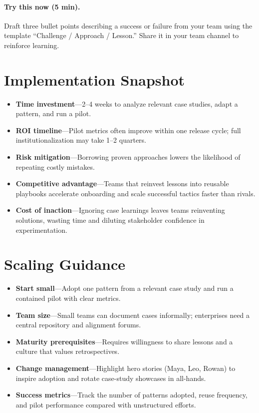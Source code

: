 \paragraph{Try this now (5 min).} Draft three bullet points describing a success or failure from your team using the template ``Challenge / Approach / Lesson.'' Share it in your team channel to reinforce learning.

\section{Implementation Snapshot}
\label{sec:case-snapshot}
\begin{itemize}
    \item \textbf{Time investment}—2--4 weeks to analyze relevant case studies, adapt a pattern, and run a pilot.
    \item \textbf{ROI timeline}—Pilot metrics often improve within one release cycle; full institutionalization may take 1--2 quarters.
    \item \textbf{Risk mitigation}—Borrowing proven approaches lowers the likelihood of repeating costly mistakes.
    \item \textbf{Competitive advantage}—Teams that reinvest lessons into reusable playbooks accelerate onboarding and scale successful tactics faster than rivals.
    \item \textbf{Cost of inaction}—Ignoring case learnings leaves teams reinventing solutions, wasting time and diluting stakeholder confidence in experimentation.
\end{itemize}

\section{Scaling Guidance}
\label{sec:case-scaling}
\begin{itemize}
    \item \textbf{Start small}—Adopt one pattern from a relevant case study and run a contained pilot with clear metrics.
    \item \textbf{Team size}—Small teams can document cases informally; enterprises need a central repository and alignment forums.
    \item \textbf{Maturity prerequisites}—Requires willingness to share lessons and a culture that values retrospectives.
    \item \textbf{Change management}—Highlight hero stories (Maya, Leo, Rowan) to inspire adoption and rotate case-study showcases in all-hands.
    \item \textbf{Success metrics}—Track the number of patterns adopted, reuse frequency, and pilot performance compared with unstructured efforts.
\end{itemize}

